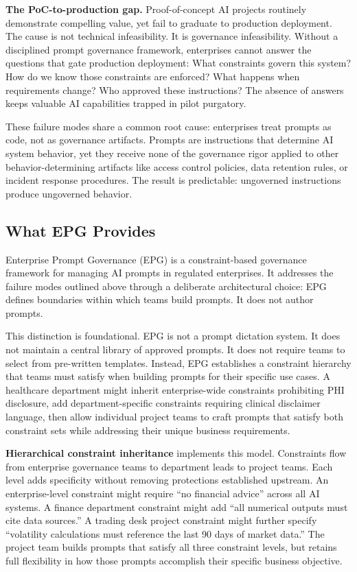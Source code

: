 \textbf{The PoC-to-production gap.} Proof-of-concept AI projects routinely demonstrate compelling value, yet fail to graduate to production deployment. The cause is not technical infeasibility. It is governance infeasibility. Without a disciplined prompt governance framework, enterprises cannot answer the questions that gate production deployment: What constraints govern this system? How do we know those constraints are enforced? What happens when requirements change? Who approved these instructions? The absence of answers keeps valuable AI capabilities trapped in pilot purgatory.

These failure modes share a common root cause: enterprises treat prompts as code, not as governance artifacts. Prompts are instructions that determine AI system behavior, yet they receive none of the governance rigor applied to other behavior-determining artifacts like access control policies, data retention rules, or incident response procedures. The result is predictable: ungoverned instructions produce ungoverned behavior.

\subsection{What EPG Provides}


Enterprise Prompt Governance (EPG) is a constraint-based governance framework for managing AI prompts in regulated enterprises. It addresses the failure modes outlined above through a deliberate architectural choice: EPG defines boundaries within which teams build prompts. It does not author prompts.

This distinction is foundational. EPG is not a prompt dictation system. It does not maintain a central library of approved prompts. It does not require teams to select from pre-written templates. Instead, EPG establishes a constraint hierarchy that teams must satisfy when building prompts for their specific use cases. A healthcare department might inherit enterprise-wide constraints prohibiting PHI disclosure, add department-specific constraints requiring clinical disclaimer language, then allow individual project teams to craft prompts that satisfy both constraint sets while addressing their unique business requirements.

\textbf{Hierarchical constraint inheritance} implements this model. Constraints flow from enterprise governance teams to department leads to project teams. Each level adds specificity without removing protections established upstream. An enterprise-level constraint might require ``no financial advice'' across all AI systems. A finance department constraint might add ``all numerical outputs must cite data sources.'' A trading desk project constraint might further specify ``volatility calculations must reference the last 90 days of market data.'' The project team builds prompts that satisfy all three constraint levels, but retains full flexibility in how those prompts accomplish their specific business objective.

